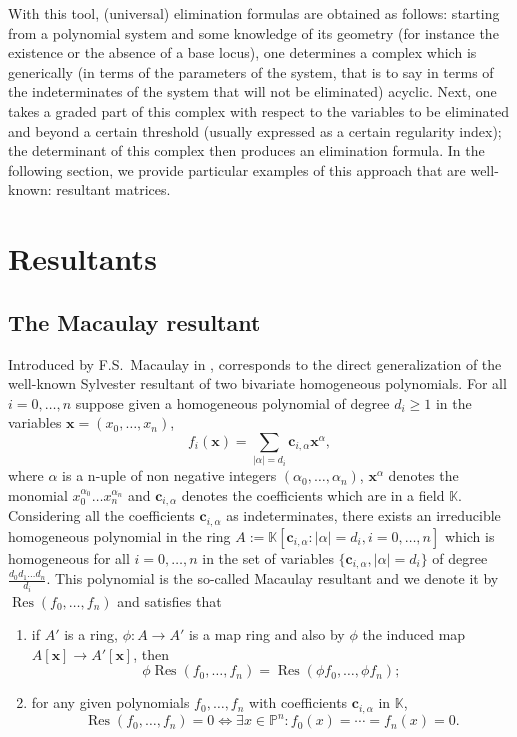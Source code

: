 \documentclass[10pt]{amsart}
\theoremstyle{plain}
\theoremstyle{definition}
\def\PP{{\mathbb{P}}}
\def\KK{{\mathbb{K}}}
\def\c{{\mathbf{c}}}
\def\x{\mathbf{x}}
\DeclareMathOperator\Res{Res}
\begin{document}
\medskip

With this tool, (universal) elimination formulas are obtained as follows: starting from a polynomial system and some knowledge of its geometry  (for instance the existence or the absence of a base locus), one determines a complex which is generically (in terms of the parameters of the system, that is to say in terms of the indeterminates of the system that will not be eliminated) acyclic. Next, one takes a graded part of this complex with respect to the variables to be eliminated and beyond a certain threshold (usually expressed as a certain regularity index); the determinant of this complex then produces an elimination formula. In the following section, we provide particular examples of this approach that are well-known: resultant matrices.  



\section{Resultants}\label{secResultants}

\subsection{The Macaulay resultant}
Introduced by F.S.\ Macaulay in {\cite{Mac02}},
corresponds to the direct generalization of the well-known Sylvester
resultant of two bivariate homogeneous polynomials. For all
$i=0,\ldots,n$ suppose given a homogeneous polynomial of degree
$d_i\geq 1$ in the variables $\x=(x_0,\ldots,x_n)$,
$$f_i(\x)=\sum_{|\alpha|=d_i}\c_{i,\alpha} \x^\alpha,$$
where $\alpha$
is a n-uple of non negative integers $(\alpha_0,\ldots,\alpha_n)$,
$\x^\alpha$ denotes the monomial $x_0^{\alpha_0}\ldots x_n^{\alpha_n}$
and $\c_{i,\alpha}$ denotes the coefficients which are in a field
$\KK$. Considering all the coefficients $\c_{i,\alpha}$ as
indeterminates, there exists an irreducible homogeneous polynomial in
the ring $A:=\KK[\c_{i,\alpha} : |\alpha|=d_i, i=0,\ldots,n]$ which is
homogeneous for all $i=0,\ldots,n$ in the set of variables
$\{\c_{i,\alpha}, |\alpha|=d_i\}$ of degree $\frac{d_0d_1\ldots
  d_n}{d_i}$. This polynomial is the so-called Macaulay resultant and
we denote it by $\Res(f_0,\hdots,f_n)$ and satisfies that
\begin{enumerate}
\item if $A'$ is a ring, $\phi:A\to A'$ is a map ring and also by $\phi$ the induced map $A[\x]\to A'[\x]$, then 
\[
 \phi \Res(f_0,\hdots,f_n) = \Res(\phi f_0,\hdots, \phi f_n);
\]
\item for any given
polynomials $f_0,\ldots,f_n$ with coefficients $\c_{i,\alpha}$ in
$\KK$, 
\[
 \Res(f_0,\ldots,f_n)=0 \Leftrightarrow \exists x\in \PP^n : f_0(x)=\cdots=f_n(x)=0.
\]
\end{enumerate} 
\end{document}
